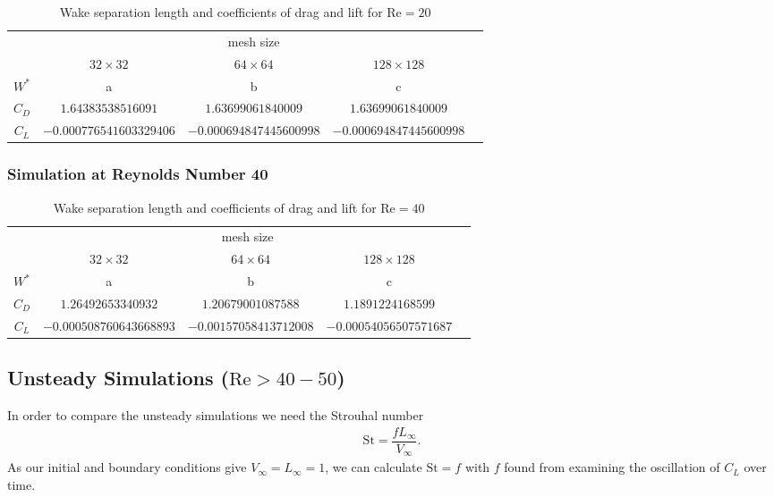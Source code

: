 		\begin{table}[htp]
			\centering
			\begin{tabular}{|c||c|c|c|c}
				\cline{1-4}
				\rule{0pt}{2,3ex}\multirow{2}{*}{}   & \multicolumn{3}{c|}{mesh size} &  \\ \cline{2-4}
				\rule{0pt}{2,3ex}& $32 \times 32$       & $64 \times 64$       & $128 \times 128$      &  \\ \cline{1-4}
				\rule{0pt}{2,3ex}$W^*$ 				 & a        & b        & c        &  \\ \cline{1-4}
				\rule{0pt}{2,3ex}$C_D$                & $1.64383538516091$        & $1.63699061840009$        & $1.63699061840009$       &  \\ \cline{1-4}
				\rule{0pt}{2,3ex}$C_L$                & $-0.000776541603329406$       & $-0.000694847445600998$       & $-0.000694847445600998$        &  \\ \cline{1-4}
			\end{tabular}
			\caption{Wake separation length and coefficients of drag and lift for $\text{Re}=20$}
			\label{tab:re20}
		\end{table}
	\subsubsection{Simulation at Reynolds Number 40}
		\begin{table}[htp]
			\centering
			\begin{tabular}{|c||c|c|c|c}
				\cline{1-4}
				\rule{0pt}{2,3ex}\multirow{2}{*}{}   & \multicolumn{3}{c|}{mesh size} &  \\ \cline{2-4}
				\rule{0pt}{2,3ex}& $32 \times 32$       & $64 \times 64$       & $128 \times 128$      &  \\ \cline{1-4}
				\rule{0pt}{2,3ex}$W^*$ 				 & a        & b        & c        &  \\ \cline{1-4}
				\rule{0pt}{2,3ex}$C_D$                & $1.26492653340932$        & $1.20679001087588$        & $1.1891224168599$       &  \\ \cline{1-4}
				\rule{0pt}{2,3ex}$C_L$                & $-0.000508760643668893$        & $-0.00157058413712008$        & $-0.00054056507571687$        &  \\ \cline{1-4}
			\end{tabular}
			\caption{Wake separation length and coefficients of drag and lift for $\text{Re}=40$}
			\label{tab:re40}
		\end{table}
	\subsection{Unsteady Simulations ($\text{Re}> 40-50$)}
	In order to compare the unsteady simulations we need the Strouhal number
	\begin{align}
		\text{St} = \dfrac{f  L_\infty}{V_\infty}.
	\end{align}
	As our initial and boundary conditions give $V_\infty = L_\infty = 1$, we can calculate $\text{St} = f$ with $f$ found from examining the oscillation of $C_L$ over time. 

